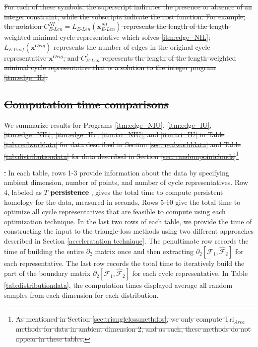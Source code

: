 \documentclass[utf8]{formatting_stuff/frontiersFPHY}
\newcommand{\originalrep}{\mathbf{x}^{Orig}}
\newcommand{\optimalrep}{\mathbf{x}}
\newcommand{\tab}{Table }
\newcommand{\se}{Section }
\newcommand{\NI}{^{NI}}
\newcommand{\EU}{_{E\text{-}Unif}}
\newcommand{\EL}{_{E\text{-}Len}}
\newcommand{\I}{^I}
\newcommand{\area}{_{Area}}
\newcommand{\Tri}{\mathrm{Tri}}
\theoremstyle{plain}
\theoremstyle{definition}
\providecommand{\DIFaddtex}[1]{{\protect\color{blue}\uwave{#1}}}
\providecommand{\DIFdeltex}[1]{{\protect\color{red}\sout{#1}}}
\providecommand{\DIFaddbegin}{} %
\providecommand{\DIFaddend}{} %
\providecommand{\DIFdelbegin}{} %
\providecommand{\DIFdelend}{} %
\providecommand{\DIFadd}[1]{\texorpdfstring{\DIFaddtex{#1}}{#1}} %
\providecommand{\DIFdel}[1]{\texorpdfstring{\DIFdeltex{#1}}{}} %
\begin{document}
\DIFdel{For each of these symbols, the superscript indicates the presence or absence of an integer constraint, while the subscripts indicate the cost function.  
For example, the notation $C\EL\NI = L\EL(\optimalrep\EL\NI)$ represents the length of the length-weighted minimal cycle representative which solves \ref{itm:edge_NIL}; $L\EU(\originalrep)$ represents the number of edges in the original cycle representative $\originalrep$; and $C\EL\I$ represents the length of the length-weighted minimal cycle representative that is a solution to the integer program \ref{itm:edge_IL}. 
}%

\subsection{\DIFdel{Computation time comparisons}} 
\addtocounter{subsection}{-1}%
 
\DIFdel{We summarize results for Programs \ref{itm:edge_NIU}, \ref{itm:edge_IU}, \ref{itm:edge_NIL},
\ref{itm:edge_IL},
\ref{itm:tri_NIU}, and 
\ref{itm:tri_IU} in \tab \ref{tab:realworldata} for data described in \se \ref{sec: realworlddata} and \tab \ref{tab:distributiondata} for data described in \se \ref{sec: randompointclouds}}\footnote{\DIFdel{As mentioned in \se \ref{sec:trianglelossmethdos}, we only compute $\Tri\area$ methods for data in ambient dimension 2, and as such, these methods do not appear in these tables.}}%
\addtocounter{footnote}{-1}%
\DIFdel{. }\DIFdelend In each table, rows 1-3 provide information about the data by specifying ambient dimension, number of points, and number of cycle representatives. Row 4, labeled as \DIFdelbegin \DIFdel{$T$ }\textbf{\DIFdel{persistence}}%
\DIFdelend \DIFaddbegin \DIFadd{$T_\textbf{persistence}$}\DIFaddend , gives the total time to compute persistent homology for the data, measured in seconds. Rows \DIFdelbegin \DIFdel{5-10 }\DIFdelend \DIFaddbegin \DIFadd{5-12 (\tab \ref{tab:realworldata}) and rows 5-14 (\tab \ref{tab:distributiondata}) }\DIFaddend give the total time to optimize all cycle representatives that are feasible to compute using each optimization technique. In the last two rows of each table, we provide the time of constructing the input to the triangle-loss methods using two different approaches described in \se \ref{acceleratation technique}. The penultimate row records the time of building the entire $\partial_{2}$ matrix once and then extracting $\partial_2[\mathcal{F}_1, \hat {\mathcal{F}}_{2}]$ for each representative. The last row records the total time to iteratively build the part of the boundary matrix $\partial_{2}[ \mathcal{F}_1 , \hat {\mathcal{F}}_{2} ]$ for each cycle representative. In \tab \ref{tab:distributiondata}, the computation times displayed average all random samples from each dimension for each distribution. 
\end{document}
